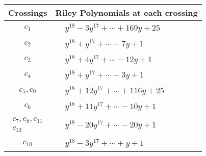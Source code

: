 \documentclass[1p]{elsarticle_modified}
\theoremstyle{definition}
\begin{document}
\begin{tabular}{m{50pt}|m{274pt}}
Crossings & \hspace{64pt}Riley Polynomials at each crossing \\
\hline $$\begin{aligned}c_{1}\end{aligned}$$&$\begin{aligned}
&y^{18}-3 y^{17}+\cdots+169 y+25
\end{aligned}$\\
\hline $$\begin{aligned}c_{2}\end{aligned}$$&$\begin{aligned}
&y^{18}+y^{17}+\cdots-7 y+1
\end{aligned}$\\
\hline $$\begin{aligned}c_{3}\end{aligned}$$&$\begin{aligned}
&y^{18}+4 y^{17}+\cdots-12 y+1
\end{aligned}$\\
\hline $$\begin{aligned}c_{4}\end{aligned}$$&$\begin{aligned}
&y^{18}+y^{17}+\cdots-3 y+1
\end{aligned}$\\
\hline $$\begin{aligned}c_{5},c_{9}\end{aligned}$$&$\begin{aligned}
&y^{18}+12 y^{17}+\cdots+116 y+25
\end{aligned}$\\
\hline $$\begin{aligned}c_{6}\end{aligned}$$&$\begin{aligned}
&y^{18}+11 y^{17}+\cdots-10 y+1
\end{aligned}$\\
\hline $$\begin{aligned}c_{7},c_{8},c_{11}\\c_{12}\end{aligned}$$&$\begin{aligned}
&y^{18}-20 y^{17}+\cdots-20 y+1
\end{aligned}$\\
\hline $$\begin{aligned}c_{10}\end{aligned}$$&$\begin{aligned}
&y^{18}-3 y^{17}+\cdots+y+1
\end{aligned}$\\
\hline
\end{tabular}\\~\\
\end{document}
